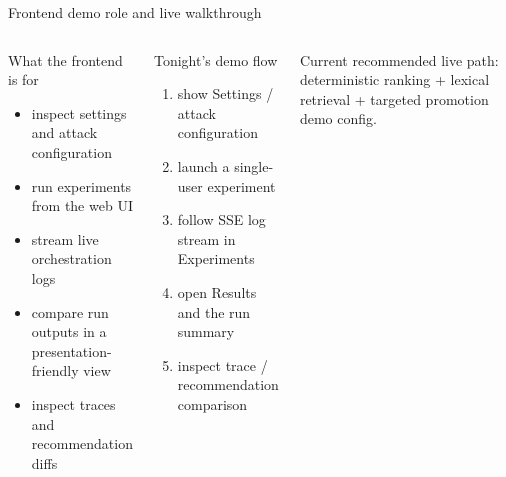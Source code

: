 \documentclass[aspectratio=169,11pt]{beamer}
\begin{document}
\begin{frame}{Frontend demo role and live walkthrough}
\begin{columns}[T,totalwidth=\textwidth]
\begin{block}{What the frontend is for}
\begin{itemize}
  \item inspect settings and attack configuration
  \item run experiments from the web UI
  \item stream live orchestration logs
  \item compare run outputs in a presentation-friendly view
  \item inspect traces and recommendation diffs
\end{itemize}
\end{block}

\begin{block}{Tonight's demo flow}
\begin{enumerate}
  \item show Settings / attack configuration
  \item launch a single-user experiment
  \item follow SSE log stream in Experiments
  \item open Results and the run summary
  \item inspect trace / recommendation comparison
\end{enumerate}
\end{block}
\vspace{0.3em}
{\footnotesize Current recommended live path: deterministic ranking + lexical retrieval + targeted promotion demo config.}
\end{columns}
\end{frame}
\end{document}
